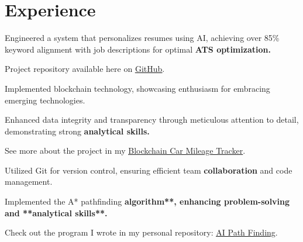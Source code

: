 \section{Experience}


\begin{tightemize}
\item Engineered a system that personalizes resumes using AI, achieving over 85\% keyword alignment with job descriptions for optimal \textbf{ATS optimization.}
\item Project repository available here on \href{https://github.com/vmsaif/ats-pass-ai}{\ul{GitHub}}.
\end{tightemize}



\begin{tightemize}
\item Implemented blockchain technology, showcasing enthusiasm for embracing emerging technologies.
\item Enhanced data integrity and transparency through meticulous attention to detail, demonstrating strong \textbf{analytical skills.}
\item See more about the project in my \href{https://example.com/blockchain-car-mileage-tracker/}{\ul{Blockchain Car Mileage Tracker}}.
\end{tightemize}



\begin{tightemize}
\item Utilized Git for version control, ensuring efficient team \textbf{collaboration} and code management.
\item Implemented the A* pathfinding \textbf{algorithm**, enhancing problem-solving and **analytical skills**.}
\item Check out the program I wrote in my personal repository: \href{https://example.com/ai-path-finding/}{\ul{AI Path Finding}}.
\end{tightemize}